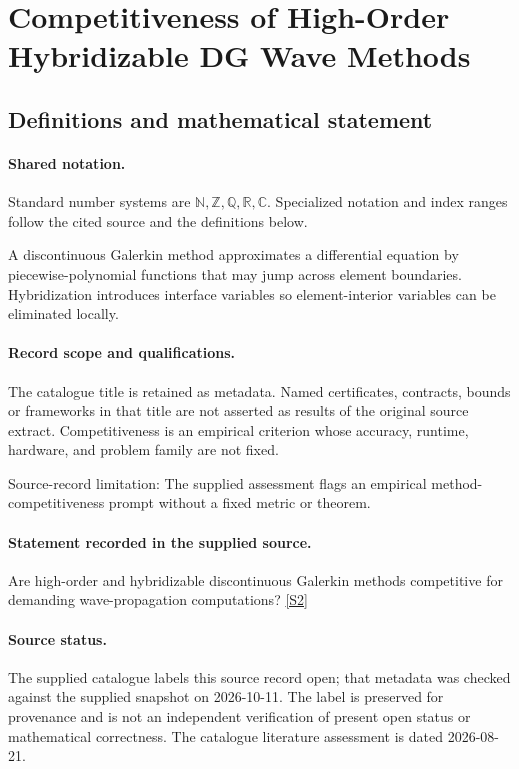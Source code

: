 \documentclass[11pt]{article}
\newcommand{\sref}[2]{\hyperlink{source:#1:#2}{[S#2]}}
\begin{document}
\section{Competitiveness of High-Order Hybridizable DG Wave Methods}\label{statement}

\subsection{Definitions and mathematical statement}

\paragraph{Shared notation.}Standard number systems are $\mathbb N,\mathbb Z,\mathbb Q,\mathbb R,\mathbb C$. Specialized notation and index ranges follow the cited source and the definitions below.


A discontinuous Galerkin method approximates a differential equation by piecewise-polynomial functions that may jump across element boundaries. Hybridization introduces interface variables so element-interior variables can be eliminated locally.
\paragraph{Record scope and qualifications.}
The catalogue title is retained as metadata. Named certificates, contracts, bounds or frameworks in that title are not asserted as results of the original source extract.
Competitiveness is an empirical criterion whose accuracy, runtime, hardware, and problem family are not fixed.

Source-record limitation: The supplied assessment flags an empirical method-competitiveness prompt without a fixed metric or theorem.
\paragraph{Statement recorded in the supplied source.}
Are high-order and hybridizable discontinuous Galerkin methods competitive for demanding wave-propagation computations? \sref{statement}{2}
\paragraph{Source status.}
The supplied catalogue labels this source record open; that metadata was checked against the supplied snapshot on 2026-10-11. The label is preserved for provenance and is not an independent verification of present open status or mathematical correctness. The catalogue literature assessment is dated 2026-08-21.
\end{document}

